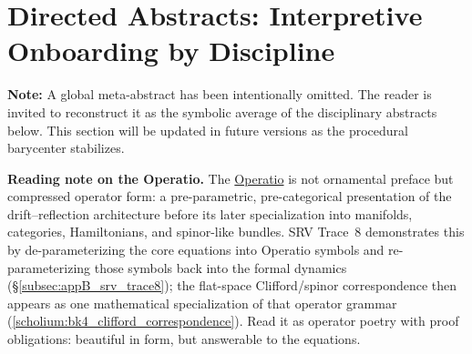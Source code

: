 \chapter{Directed Abstracts: Interpretive Onboarding by Discipline}
\label{sec:appE_directed_abstracts}

\noindent
\textbf{Note:} A global meta-abstract has been intentionally omitted. The reader is invited to reconstruct it as the symbolic average of the disciplinary abstracts below. This section will be updated in future versions as the procedural barycenter stabilizes.

\medskip
\noindent
\textbf{Reading note on the Operatio.} The \hyperref[sec:bk1_operatio]{Operatio} is not ornamental preface but compressed operator form: a pre-parametric, pre-categorical presentation of the drift--reflection architecture before its later specialization into manifolds, categories, Hamiltonians, and spinor-like bundles. SRV Trace~8 demonstrates this by de-parameterizing the core equations into Operatio symbols and re-parameterizing those symbols back into the formal dynamics (\S\ref{subsec:appB_srv_trace8}); the flat-space Clifford/spinor correspondence then appears as one mathematical specialization of that operator grammar (\ref{scholium:bk4_clifford_correspondence}). Read it as operator poetry with proof obligations: beautiful in form, but answerable to the equations.

